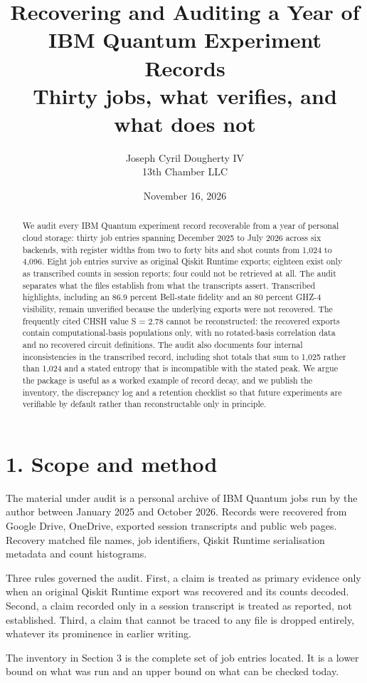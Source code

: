 \documentclass[11pt]{article}
\title{Recovering and Auditing a Year of IBM Quantum Experiment Records\\[4pt]\large Thirty jobs, what verifies, and what does not}
\author{Joseph Cyril Dougherty IV\\13th Chamber LLC}
\date{November 16, 2026}
\begin{document}
\maketitle
\begin{abstract}We audit every IBM Quantum experiment record recoverable from a year of personal cloud storage: thirty job entries spanning December 2025 to July 2026 across six backends, with register widths from two to forty bits and shot counts from 1,024 to 4,096. Eight job entries survive as original Qiskit Runtime exports; eighteen exist only as transcribed counts in session reports; four could not be retrieved at all. The audit separates what the files establish from what the transcripts assert. Transcribed highlights, including an 86.9 percent Bell-state fidelity and an 80 percent GHZ-4 visibility, remain unverified because the underlying exports were not recovered. The frequently cited CHSH value S = 2.78 cannot be reconstructed: the recovered exports contain computational-basis populations only, with no rotated-basis correlation data and no recovered circuit definitions. The audit also documents four internal inconsistencies in the transcribed record, including shot totals that sum to 1,025 rather than 1,024 and a stated entropy that is incompatible with the stated peak. We argue the package is useful as a worked example of record decay, and we publish the inventory, the discrepancy log and a retention checklist so that future experiments are verifiable by default rather than reconstructable only in principle.\end{abstract}
\section*{1. Scope and method}
The material under audit is a personal archive of IBM Quantum jobs run by the author between January 2025 and October 2026. Records were recovered from Google Drive, OneDrive, exported session transcripts and public web pages. Recovery matched file names, job identifiers, Qiskit Runtime serialisation metadata and count histograms.

Three rules governed the audit. First, a claim is treated as primary evidence only when an original Qiskit Runtime export was recovered and its counts decoded. Second, a claim recorded only in a session transcript is treated as reported, not established. Third, a claim that cannot be traced to any file is dropped entirely, whatever its prominence in earlier writing.

The inventory in Section 3 is the complete set of job entries located. It is a lower bound on what was run and an upper bound on what can be checked today.
\end{document}
